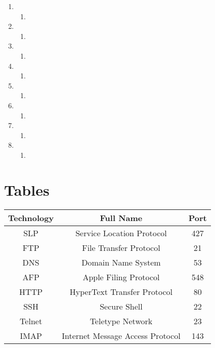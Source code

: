 \documentclass{article}
\begin{document}
\begin{enumerate}
\begin{enumerate}
    \end{enumerate}
    \item 
    \begin{enumerate}
        \item 
    \end{enumerate}
    \item 
    \begin{enumerate}
        \item 
    \end{enumerate}
    \item 
    \begin{enumerate}
        \item 
    \end{enumerate}
    \item 
    \begin{enumerate}
        \item 
    \end{enumerate}
    \item 
    \begin{enumerate}
        \item 
    \end{enumerate}
    \item 
    \begin{enumerate}
        \item 
    \end{enumerate}
    \item 
    \begin{enumerate}
        \item 
    \end{enumerate}
    \item 
    \begin{enumerate}
        \item 
    \end{enumerate}
    
\end{enumerate}
\section{Tables}
\begin{tabular}{|c|c|c|}
\hline
    Technology & Full Name & Port \\
    \hline
   SLP  & Service Location Protocol & 427\\
   FTP & File Transfer Protocol & 21 \\
   DNS & Domain Name System & 53\\
   AFP & Apple Filing Protocol & 548 \\
   HTTP & HyperText Transfer Protocol & 80 \\
   SSH & Secure Shell & 22 \\
   Telnet & Teletype Network & 23\\
   IMAP & Internet Message Access Protocol & 143\\
   \hline
\end{tabular}
\end{document}
